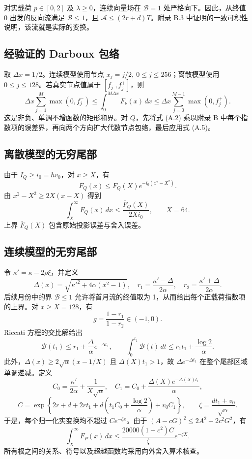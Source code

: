 对实载荷 \(p\in[0,2]\) 及 \(\lambda\ge0\)，连续向量场在 \(\mathcal B=1\) 处严格向下。因此，从终值 0 出发的反向流满足 \(\mathcal B\le1\)，且 \(\mathcal A\le(2r+d)T\)。附录 B.3 中证明的一致可积性说明，该流就是实际的变换。

\subsection{经验证的 Darboux 包络}

取 \(\Delta x=1/2\)。连续模型使用节点 \(x_j=j/2,\ 0\le j\le256\)；离散模型使用 \(0\le j\le128\)。若真实节点值属于 \([f_j^-,f_j^+]\)，则
\[
\Delta x\sum_{j=1}^{M}\max(0,f_j^-)
\le\int_0^{M\Delta x}F_\nu(x)\,dx
\le\Delta x\sum_{j=0}^{M-1}\max(0,f_j^+).
\tag{A.5}
\]
这是非负、单调不增函数的矩形和界。对 \(Q\)，先将式 (A.2) 乘以附录 B 中每个指数项的误差界，再向两个方向扩大代数节点包络，最后应用式 (A.5)。

\subsection{离散模型的无穷尾部}

由于 \(I_Q\ge i_0=hv_0\)，对 \(x\ge X\)，有
\[
F_Q(x)\le F_Q(X)e^{-i_0(x^2-X^2)}.
\]
由 \(x^2-X^2\ge2X(x-X)\) 得到
\[
\int_X^\infty F_Q(x)\,dx\le\frac{\overline F_Q(X)}{2Xi_0},
\qquad X=64.
\tag{A.6}
\]
上界 \(\overline F_Q(X)\) 包含原始投影误差与舍入误差。

\subsection{连续模型的无穷尾部}

令 \(\kappa'=\kappa-2\rho\xi\)，并定义
\[
\Delta(x)=\sqrt{\kappa'^2+4\alpha(x^2-1)},\quad
r_1=\frac{\kappa'-\Delta}{2\alpha},\quad
r_2=\frac{\kappa'+\Delta}{2\alpha}.
\]
后续月份中的界 \(\mathcal B\le1\) 允许将首月流的终值取为 1，从而给出每个正载荷指数项的上界。对 \(x\ge X=128\)，有
\[
g=\frac{1-r_1}{1-r_2}\in(-1,0).
\]
Riccati 方程的交比解给出
\[
\mathcal B(t_1)\le r_1+\frac{\Delta}{\alpha}e^{-\Delta t_1},
\qquad
\int_0^{t_1}\mathcal B(t)\,dt
\le r_1t_1+\frac{\log2}{\alpha}.
\tag{A.7}
\]
此外，\(\Delta(x)\ge2\sqrt\alpha(x-1/X)\) 且 \(\Delta(X)t_1>1\)，故 \(\Delta e^{-\Delta t_1}\) 在整个尾部区域单调递减。定义
\[
C_0=\frac{\kappa'}{2\alpha}+\frac1{X\sqrt\alpha},\quad
C_1=C_0+\frac{\Delta(X)e^{-\Delta(X)t_1}}{\alpha},
\]
\[
C=\exp\!\left\{2r+d+2rt_1+
d\left(t_1C_0+\frac{\log2}{\alpha}\right)+v_0C_1\right\},
\qquad \zeta=\frac{dt_1+v_0}{\sqrt\alpha}.
\]
于是，每个归一化实变换均不超过 \(Ce^{-\zeta x}\)。由于 \((A-cG)^2\le2A^2+2c^2G^2\)，有
\[
\int_X^\infty F_P(x)\,dx
\le \frac{20000(1+c^2)C}{\zeta}e^{-\zeta X}.
\tag{A.8}
\]
所有根之间的关系、符号以及超越函数均采用向外舍入算术核查。


